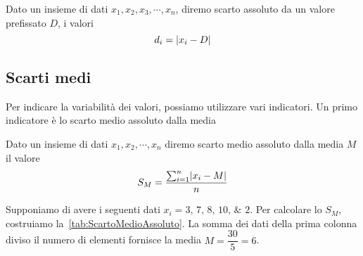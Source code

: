 \begin{defn}
Dato un insieme di dati  $x_{1},x_{2},x_{3},\cdots,x_{n}$, diremo scarto assoluto da un valore prefissato $D$,  i valori \[d_{i}= \abs{x_{i}-D }\]
\end{defn}
\subsection{Scarti medi}
Per indicare la variabilità dei valori,  possiamo utilizzare vari indicatori. Un primo indicatore è lo scarto medio assoluto dalla media
\begin{defn}
Dato un insieme di dati  $x_{1},x_{2},\cdots,x_{n}$ diremo scarto medio assoluto dalla media $M$  il valore \[ S_{M}=\dfrac{\sum_{i=1}^{n}\abs{x_{i}-M}}{n}\]
\end{defn}
Supponiamo di avere i seguenti dati $x_{i}=\numlist{3;7;8;10;2}$. Per calcolare lo $S_{M}$, costruiamo la~\vref{tab:ScartoMedioAssoluto}. La somma dei dati della prima colonna diviso il numero di elementi fornisce la media $M=\dfrac{30}{5}=6$.  

